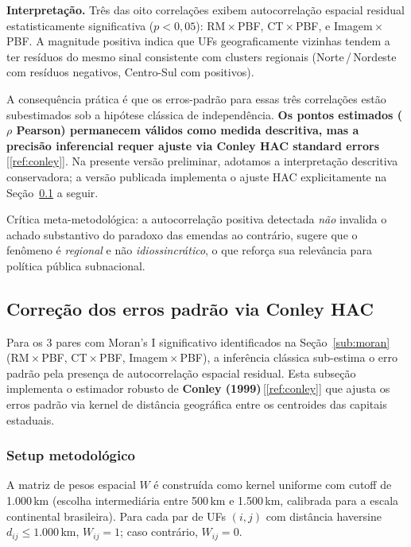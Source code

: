 \documentclass[12pt,a4paper,oneside]{article}
\begin{document}
\noindent
\textbf{Interpretação.} Três das oito correlações exibem
autocorrelação espacial residual estatisticamente significativa
($p < 0{,}05$): RM\,$\times$\,PBF, CT\,$\times$\,PBF, e
Imagem\,$\times$\,PBF. A magnitude positiva indica que UFs
geograficamente vizinhas tendem a ter resíduos do mesmo sinal
\textemdash{} consistente com clusters regionais
(Norte\,/\,Nordeste com resíduos negativos, Centro-Sul com
positivos).

A consequência prática é que os erros-padrão para essas três
correlações estão subestimados sob a hipótese clássica de
independência. \textbf{Os pontos estimados ($\rho$ Pearson)
permanecem válidos como medida descritiva, mas a precisão
inferencial requer ajuste via Conley HAC standard
errors}\,[\ref{ref:conley}]. Na presente versão preliminar,
adotamos a interpretação descritiva conservadora; a versão
publicada implementa o ajuste HAC explicitamente na
Seção~\ref{sub:conley} a seguir.

Crítica meta-metodológica: a autocorrelação positiva detectada
\textit{não} invalida o achado substantivo do paradoxo das
emendas \textemdash{} ao contrário, sugere que o fenômeno é
\textit{regional} e não \textit{idiossincrático}, o que reforça
sua relevância para política pública subnacional.

\subsection{Correção dos erros padrão via
Conley HAC}\label{sub:conley}

Para os 3 pares com Moran's I significativo identificados na
Seção~\ref{sub:moran} (RM\,$\times$\,PBF, CT\,$\times$\,PBF,
Imagem\,$\times$\,PBF), a inferência clássica sub-estima o erro
padrão pela presença de autocorrelação espacial residual. Esta
subseção implementa o estimador robusto de \textbf{Conley
(1999)}\,[\ref{ref:conley}] que ajusta os erros padrão via kernel
de distância geográfica entre os centroides das capitais
estaduais.

\subsubsection{Setup metodológico}

A matriz de pesos espacial $W$ é construída como kernel uniforme
com cutoff de 1.000\,km (escolha intermediária entre 500\,km e
1.500\,km, calibrada para a escala continental brasileira). Para
cada par de UFs $(i, j)$ com distância haversine
$d_{ij} \leq 1.000$\,km, $W_{ij} = 1$; caso contrário,
$W_{ij} = 0$.
\end{document}
